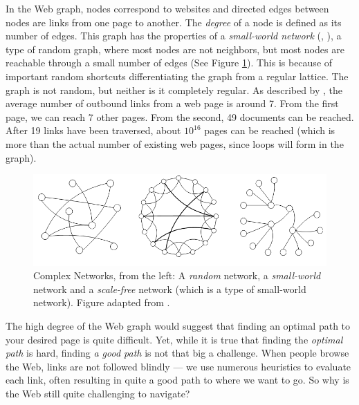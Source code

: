 In the Web graph, nodes correspond to websites and
directed edges between nodes are links from one page to another. The \emph{degree} of a node is defined as its number of edges.
This graph has the properties of a \emph{small-world network} (\citep{Newman2000}, \citep[p2]{Huang2005}), 
a type of random graph, where most nodes are not neighbors, but most nodes are reachable through a small number of edges (See Figure \ref{fig:swn}). 
This is because of important random shortcuts differentiating the graph from a regular lattice. 
The graph is not  random, but neither is it completely regular.
As described by \citet[p37]{Barabasi2003}, the average number of outbound links from a web page is around 7.
From the first page, we can reach 7 other pages. From the second, 49 documents can be reached. 
After 19 links have been traversed, about $10^{16}$ pages can be reached (which is more than the actual number of existing web pages, since loops will form in the graph).

\begin{figure}[t]
  \includegraphics[width=\textwidth]{../graphics/graphs}
  \caption[Examples of Complex Networks]{
    Complex Networks,
    from the left: A \emph{random} network, a \emph{small-world} network and a \emph{scale-free} network 
    (which is a type of  small-world network). Figure adapted from \citep[p2]{Huang2005}.} 
  \label{fig:swn}
\end{figure}


The high degree of the Web graph would suggest that finding an optimal path to your desired page is quite difficult. 
Yet, while it is true that finding the \emph{optimal path} is hard, finding \emph{a good path} is not that big a challenge. 
When people browse the Web, links are not followed blindly --- 
we use numerous heuristics to evaluate each link, often resulting in quite a good path to where we want to go. 
So why is the Web still quite challenging to navigate?

